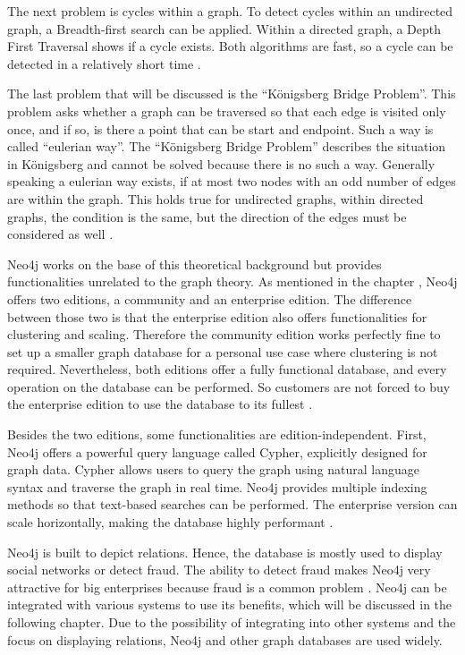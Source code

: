 The next problem is cycles within a graph. To detect cycles within an undirected graph, a Breadth-first search can be applied. Within a directed graph, a Depth First Traversal shows if a cycle exists. Both algorithms are fast, so a cycle can be detected in a relatively short time \parencite{graphCircle, cycle_directed}.

The last problem that will be discussed is the \enquote{Königsberg Bridge Problem}. This problem asks whether a graph can be traversed so that each edge is visited only once, and if so, is there a point that can be start and endpoint. Such a way is called \enquote{eulerian way}. The
\enquote{Königsberg Bridge Problem} describes the situation in Königsberg and cannot be solved because there is no such a way. Generally speaking a eulerian way exists, if at most two nodes with an odd number of edges are within the graph. This holds true for undirected graphs, within directed graphs, the condition is the same, but the direction of the edges must be considered as well \parencite{koenigsberger}.

Neo4j works on the base of this theoretical background but provides functionalities unrelated to the graph theory. As mentioned in the chapter , Neo4j offers two editions, a community and an enterprise edition. The difference between those two is that the enterprise edition also offers functionalities for clustering and scaling. Therefore the community edition works perfectly fine to set up a smaller
graph database for a personal use case where clustering is not required. Nevertheless, both editions offer a fully functional database, and every operation on the database can be performed. So customers are not forced to buy the enterprise edition to use the database to its fullest \parencite{Neo4jfeatures}.

Besides the two editions, some functionalities are edition-independent. First, Neo4j offers a powerful query language called Cypher, explicitly designed for graph data. Cypher allows users to query the graph using natural language syntax and traverse the graph in real time. Neo4j provides multiple indexing methods so that text-based searches can be performed.
The enterprise version can scale horizontally, making the database highly performant \parencite{Neo4jfeatures}.

Neo4j is built to depict relations. Hence, the database is mostly used to display social networks or detect fraud. The ability to detect fraud makes Neo4j very attractive for big enterprises because fraud is a common problem \parencite{Neo4jfeatures}. Neo4j can be integrated with various systems to use its benefits, which will be discussed in the following chapter. Due to the possibility of integrating into other systems and the focus on displaying relations, Neo4j and other graph databases are used widely.

